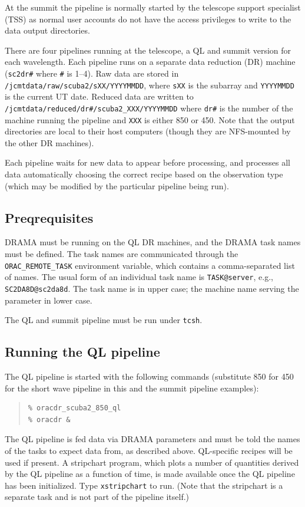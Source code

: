 \documentclass[twoside,11pt]{article}
\renewcommand{\_}{\texttt{\symbol{95}}}
\newenvironment{myquote}{\begin{quote}\begin{small}}{\end{small}\end{quote}}
\begin{document}
At the summit the pipeline is normally started by the telescope
support specialist (TSS) as normal user accounts do not have the
access privileges to write to the data output directories.

There are four pipelines running at the telescope, a QL and summit
version for each wavelength. Each pipeline runs on a separate data
reduction (DR) machine (\verb+sc2dr#+ where \verb+#+ is 1--4). Raw
data are stored in \verb+/jcmtdata/raw/scuba2/sXX/YYYYMMDD+, where
\verb+sXX+ is the subarray and \verb+YYYYMMDD+ is the current
UT date. Reduced data are written
to\\ \verb+/jcmtdata/reduced/dr#/scuba2_XXX/YYYYMMDD+ where \verb+dr#+
is the number of the machine running the pipeline and \verb+XXX+ is
either 850 or 450. Note that the output directories are local to their
host computers (though they are NFS-mounted by the other DR machines).

Each pipeline waits for new data to appear before processing, and
processes all data automatically choosing the correct recipe based on
the observation type (which may be modified by the particular pipeline
being run).

\subsection{Preqrequisites}

DRAMA must be running on the QL DR machines, and the DRAMA task names
must be defined. The task names are communicated through the
\verb+ORAC_REMOTE_TASK+ environment variable, which contains a
comma-separated list of names. The usual form of an individual task
name is \verb+TASK@server+, e.g., \verb+SC2DA8D@sc2da8d+. The task
name is in upper case; the machine name serving the parameter in lower
case.

The QL and summit pipeline must be run under \verb+tcsh+.

\subsection{Running the QL pipeline}

The QL pipeline is started with the following commands (substitute 850
for 450 for the short wave pipeline in this and the summit pipeline
examples):
\begin{myquote}
\begin{verbatim}
% oracdr_scuba2_850_ql
% oracdr &
\end{verbatim}
\end{myquote}
The QL pipeline is fed data via DRAMA parameters and must be told the
names of the tasks to expect data from, as described
above. QL-specific recipes will be used if present. A stripchart
program, which plots a number of quantities derived by the QL pipeline
as a function of time, is made available once the QL pipeline has been
initialized. Type \verb+xstripchart+ to run. (Note that the stripchart
is a separate task and is not part of the pipeline itself.)
\end{document}
